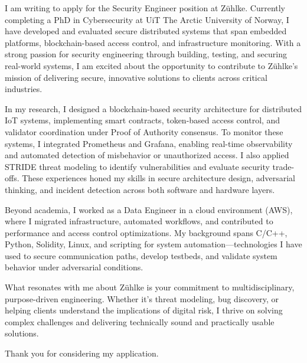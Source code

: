 I am writing to apply for the Security Engineer position at Zühlke. Currently completing a PhD in Cybersecurity at UiT The Arctic University of Norway, I have developed and evaluated secure distributed systems that span embedded platforms, blockchain-based access control, and infrastructure monitoring. With a strong passion for security engineering through building, testing, and securing real-world systems, I am excited about the opportunity to contribute to Zühlke’s mission of delivering secure, innovative solutions to clients across critical industries.

In my research, I designed a blockchain-based security architecture for distributed IoT systems, implementing smart contracts, token-based access control, and validator coordination under Proof of Authority consensus. To monitor these systems, I integrated Prometheus and Grafana, enabling real-time observability and automated detection of misbehavior or unauthorized access. I also applied STRIDE threat modeling to identify vulnerabilities and evaluate security trade-offs. These experiences honed my skills in secure architecture design, adversarial thinking, and incident detection across both software and hardware layers.

Beyond academia, I worked as a Data Engineer in a cloud environment (AWS), where I migrated infrastructure, automated workflows, and contributed to performance and access control optimizations. My background spans C/C++, Python, Solidity, Linux, and scripting for system automation—technologies I have used to secure communication paths, develop testbeds, and validate system behavior under adversarial conditions.

What resonates with me about Zühlke is your commitment to multidisciplinary, purpose-driven engineering. Whether it’s threat modeling, bug discovery, or helping clients understand the implications of digital risk, I thrive on solving complex challenges and delivering technically sound and practically usable solutions. 

Thank you for considering my application. 